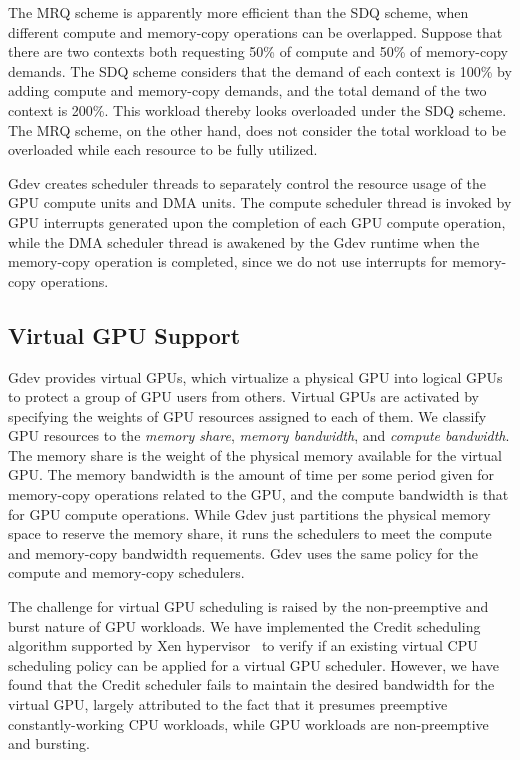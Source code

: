 The MRQ scheme is apparently more efficient than the SDQ scheme, when
different compute and memory-copy operations can be overlapped.
Suppose that there are two contexts both requesting 50\% of compute
and 50\% of memory-copy demands.
The SDQ scheme considers that the demand of each context is 100\% by
adding compute and memory-copy demands, and the total demand of the
two context is 200\%.
This workload thereby looks overloaded under the SDQ scheme.
The MRQ scheme, on the other hand, does not consider the total workload
to be overloaded while each resource to be fully utilized.

Gdev creates scheduler threads to separately control the resource
usage of the GPU compute units and DMA units.
The compute scheduler thread is invoked by GPU interrupts generated upon
the completion of each GPU compute operation, while the DMA scheduler
thread is awakened by the Gdev runtime when the memory-copy operation is
completed, since we do not use interrupts for memory-copy operations.

\subsection{Virtual GPU Support}
\label{sec:virtual_gpu}

Gdev provides virtual GPUs, which virtualize a physical GPU into logical
GPUs to protect a group of GPU users from others.
Virtual GPUs are activated by specifying the weights of GPU resources
assigned to each of them.
We classify GPU resources to the \textit{memory share}, \textit{memory
bandwidth}, and \textit{compute bandwidth}.
The memory share is the weight of the physical memory available for the
virtual GPU.
The memory bandwidth is the amount of time per some period given for
memory-copy operations related to the GPU, and the compute bandwidth is
that for GPU compute operations.
While Gdev just partitions the physical memory space to reserve the
memory share, it runs the schedulers to meet the compute and memory-copy
bandwidth requements.
Gdev uses the same policy for the compute and memory-copy schedulers.

The challenge for virtual GPU scheduling is raised by the non-preemptive
and burst nature of GPU workloads.
We have implemented the Credit scheduling algorithm supported by Xen
hypervisor~\cite{Barham_SOSP03} to verify if an existing virtual CPU
scheduling policy can be applied for a virtual GPU scheduler.
However, we have found that the Credit scheduler fails to maintain the
desired bandwidth for the virtual GPU, largely attributed to the fact
that it presumes preemptive constantly-working CPU workloads, while GPU
workloads are non-preemptive and bursting.

